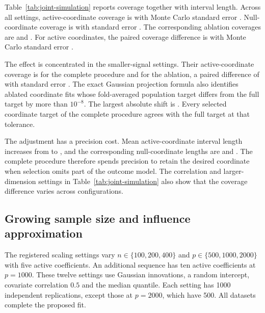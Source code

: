 Table~\ref{tab:joint-simulation} reports coverage together with interval
length. Across all settings, active-coordinate coverage is
\JointActiveCoverage{} with Monte Carlo standard error
\JointActiveMCSE{}. Null-coordinate coverage is
\JointNullCoverage{} with standard error \JointNullMCSE{}.
The corresponding ablation coverages are
\JointActiveAblationCoverage{} and \JointNullAblationCoverage{}.
For active coordinates, the paired coverage difference is
\JointActiveCoverageDifference{} with Monte Carlo standard error
\JointActiveDifferenceMCSE{}.

The effect is concentrated in the smaller-signal settings. Their
active-coordinate coverage is \JointWeakCoverage{} for the complete
procedure and \JointWeakAblationCoverage{} for the ablation, a paired
difference of \JointWeakDifference{} with standard error
\JointWeakDifferenceMCSE{}. The exact Gaussian projection formula
also identifies \JointAblationShiftCount{} ablated coordinate fits
whose fold-averaged population target differs from the full target by
more than $10^{-8}$. The largest absolute shift is
\JointAblationMaxShift{}. Every selected coordinate target of the
complete procedure agrees with the full target at that tolerance.



The adjustment has a precision cost. Mean active-coordinate interval
length increases from \JointActiveAblationLength{} to
\JointActiveLength{}, and the corresponding null-coordinate lengths
are \JointNullAblationLength{} and \JointNullLength{}. The complete
procedure therefore spends precision to retain the desired coordinate
when selection omits part of the outcome model. The correlation and
larger-dimension settings in Table~\ref{tab:joint-simulation} also
show that the coverage difference varies across configurations.

\subsection{Growing sample size and influence approximation}\label{subsec:sim-influence}


The registered scaling settings vary $n\in\{100,200,400\}$ and
$p\in\{500,1000,2000\}$ with five active coefficients. An additional
sequence has ten active coefficients at $p=1000$. These twelve
settings use Gaussian innovations, a random intercept, covariate
correlation $0.5$ and the median quantile. Each setting has 1000
independent replications, except those at $p=2000$, which have 500.
All \GaussianDiagnosticDatasets{} datasets complete the proposed fit.

